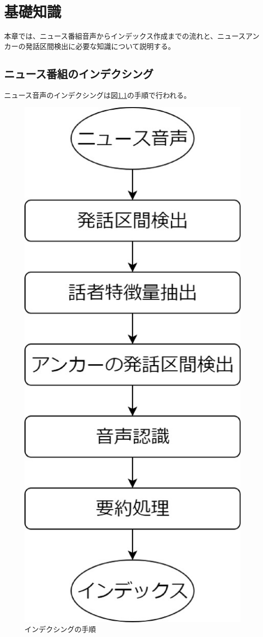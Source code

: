 \chapter{基礎知識}
\label{chapter:kisotisiki}
本章では、ニュース番組音声からインデックス作成までの流れと、ニュースアンカーの発話区間検出に必要な知識について説明する。
\section{ニュース番組のインデクシング}
ニュース音声のインデクシングは図\ref{fig:indexing}の手順で行われる。

\begin{figure}[H]
  \begin{center}
    \includegraphics[scale=0.3]{./figure/indexing.eps}
  \end{center}
  \caption{インデクシングの手順 \label{fig:indexing}}
\end{figure}

